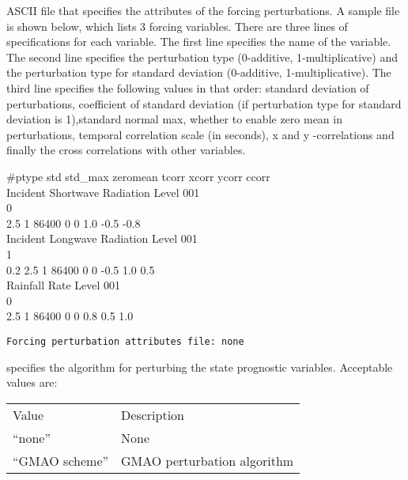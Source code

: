  
  ASCII file that
 specifies the attributes of the forcing perturbations. 
 A sample file is shown below, which lists 3 forcing 
 variables. There are three lines of specifications for 
 each variable. The first line specifies the name of the 
 variable. The second line specifies the perturbation type
 (0-additive, 1-multiplicative) and the perturbation type 
 for standard deviation (0-additive, 1-multiplicative). The 
 third line specifies the following values in that order: 
 standard deviation of perturbations, coefficient of 
 standard deviation (if perturbation type for standard 
 deviation is 1),standard normal max, whether to enable
 zero mean in perturbations, temporal correlation scale 
 (in seconds), x and y -correlations and finally the cross
 correlations with other variables. 

 \#ptype   std    std\_max   zeromean  tcorr  xcorr ycorr ccorr \\
 \indent Incident Shortwave Radiation Level 001                 \\
   0                                                   \\
      2.5     1     86400     0     0     1.0  -0.5  -0.8 \\
 \indent Incident Longwave Radiation Level 001                        \\
   1                                                         \\
      0.2     2.5   1   86400  0    0    -0.5   1.0  0.5  \\
 \indent Rainfall Rate Level 001                                      \\
   0                                                         \\
      2.5     1       86400  0     0     0.8   0.5  1.0
 

 \begin{Verbatim}[frame=single]
Forcing perturbation attributes file: none
 \end{Verbatim}

 
  specifies the algorithm for
 perturbing the state prognostic variables.
 Acceptable values are: 

 \begin{tabular}{ll}
 Value           & Description                 \\
 ``none''        & None                        \\
 ``GMAO scheme'' & GMAO perturbation algorithm \\
 \end{tabular}
 

